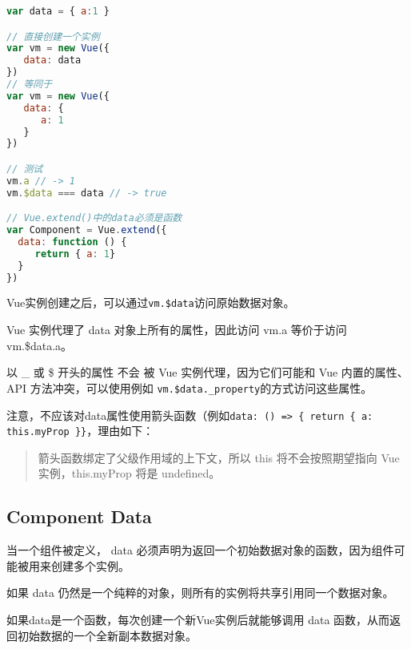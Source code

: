 \begin{lstlisting}[language=JavaScript]
var data = { a:1 }

// 直接创建一个实例
var vm = new Vue({
   data: data
})
// 等同于
var vm = new Vue({
   data: {
      a: 1
   }
})

// 测试
vm.a // -> 1
vm.$data === data // -> true

// Vue.extend()中的data必须是函数
var Component = Vue.extend({
  data: function () {
     return { a: 1}
  }
})
\end{lstlisting}

\begin{compactitem}
\item Vue实例创建之后，可以通过\texttt{vm.\$data}访问原始数据对象。
\item Vue 实例代理了 data 对象上所有的属性，因此访问 vm.a 等价于访问 vm.\$data.a。
\end{compactitem}


以 \_ 或 \$ 开头的属性 不会 被 Vue 实例代理，因为它们可能和 Vue 内置的属性、 API 方法冲突，可以使用例如 \texttt{vm.\$data.\_property}的方式访问这些属性。




注意，不应该对data属性使用箭头函数（例如\texttt{data: () => \{ return \{ a: this.myProp \}\}}，理由如下：

\begin{quotation}
箭头函数绑定了父级作用域的上下文，所以 this 将不会按照期望指向 Vue 实例，this.myProp 将是 undefined。
\end{quotation}

\subsection{Component Data}


当一个组件被定义， data 必须声明为返回一个初始数据对象的函数，因为组件可能被用来创建多个实例。

\begin{compactitem}
\item 如果 data 仍然是一个纯粹的对象，则所有的实例将共享引用同一个数据对象。
\item 如果data是一个函数，每次创建一个新Vue实例后就能够调用 data 函数，从而返回初始数据的一个全新副本数据对象。
\end{compactitem}






\begin{lstlisting}[language=JavaScript]

\end{lstlisting}




